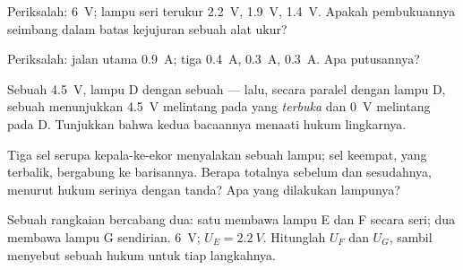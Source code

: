 \begin{exercise}[$\star$]\label{exo:g8:circuit-laws:7}
Periksalah:  \qty{6}{V}; lampu seri terukur \qty{2.2}{V},
\qty{1.9}{V}, \qty{1.4}{V}. Apakah pembukuannya seimbang dalam batas
kejujuran sebuah alat ukur?
\end{exercise}

\begin{exercise}[$\star$]\label{exo:g8:circuit-laws:8}
Periksalah: jalan utama \qty{0.9}{A}; tiga  \qty{0.4}{A},
\qty{0.3}{A}, \qty{0.3}{A}. Apa putusannya?
\end{exercise}

\begin{exercise}[$\star\star$]\label{exo:g8:circuit-laws:9}
Sebuah  \qty{4.5}{V}, lampu D  dengan sebuah
 --- lalu, secara paralel dengan lampu D, sebuah 
menunjukkan \qty{4.5}{V} melintang pada  yang \emph{terbuka}
dan \qty{0}{V} melintang pada D. Tunjukkan bahwa kedua bacaannya
menaati hukum  lingkarnya.
\end{exercise}

\begin{exercise}[$\star\star$]\label{exo:g8:circuit-laws:10}
Tiga sel serupa kepala-ke-ekor menyalakan sebuah lampu; sel keempat,
yang terbalik, bergabung ke barisannya. Berapa  totalnya
sebelum dan sesudahnya, menurut hukum serinya dengan tanda? Apa yang
dilakukan lampunya?
\end{exercise}

\begin{exercise}[$\star\star$]\label{exo:g8:circuit-laws:11}
Sebuah rangkaian bercabang dua:  satu membawa lampu E dan F
secara seri;  dua membawa lampu G sendirian. 
\qty{6}{V}; $U_E = \qty{2.2}{V}$. Hitunglah $U_F$ dan $U_G$, sambil
menyebut sebuah hukum untuk tiap langkahnya.
\end{exercise}

